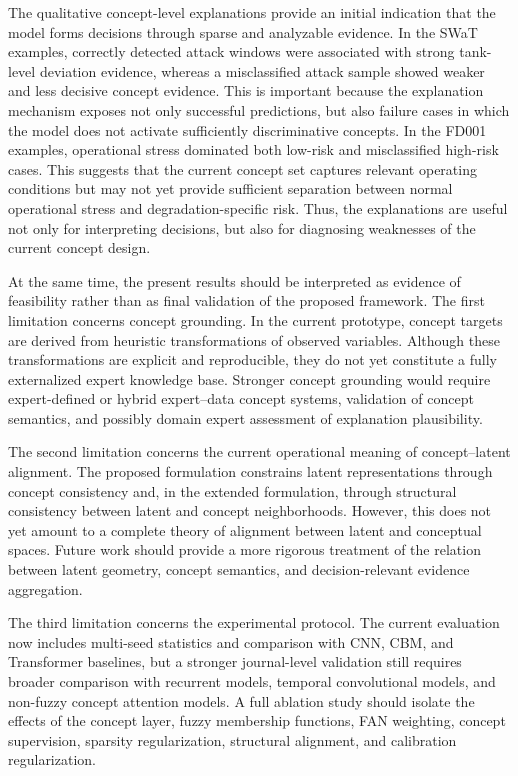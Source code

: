 \documentclass[runningheads]{llncs}
\begin{document}
The qualitative concept-level explanations provide an initial indication that the model forms decisions through sparse and analyzable evidence. In the SWaT examples, correctly detected attack windows were associated with strong tank-level deviation evidence, whereas a misclassified attack sample showed weaker and less decisive concept evidence. This is important because the explanation mechanism exposes not only successful predictions, but also failure cases in which the model does not activate sufficiently discriminative concepts. In the FD001 examples, operational stress dominated both low-risk and misclassified high-risk cases. This suggests that the current concept set captures relevant operating conditions but may not yet provide sufficient separation between normal operational stress and degradation-specific risk. Thus, the explanations are useful not only for interpreting decisions, but also for diagnosing weaknesses of the current concept design.

At the same time, the present results should be interpreted as evidence of feasibility rather than as final validation of the proposed framework. The first limitation concerns concept grounding. In the current prototype, concept targets are derived from heuristic transformations of observed variables. Although these transformations are explicit and reproducible, they do not yet constitute a fully externalized expert knowledge base. Stronger concept grounding would require expert-defined or hybrid expert--data concept systems, validation of concept semantics, and possibly domain expert assessment of explanation plausibility.

The second limitation concerns the current operational meaning of concept--latent alignment. The proposed formulation constrains latent representations through concept consistency and, in the extended formulation, through structural consistency between latent and concept neighborhoods. However, this does not yet amount to a complete theory of alignment between latent and conceptual spaces. Future work should provide a more rigorous treatment of the relation between latent geometry, concept semantics, and decision-relevant evidence aggregation.

The third limitation concerns the experimental protocol. The current evaluation now includes multi-seed statistics and comparison with CNN, CBM, and Transformer baselines, but a stronger journal-level validation still requires broader comparison with recurrent models, temporal convolutional models, and non-fuzzy concept attention models. A full ablation study should isolate the effects of the concept layer, fuzzy membership functions, FAN weighting, concept supervision, sparsity regularization, structural alignment, and calibration regularization.
\end{document}
